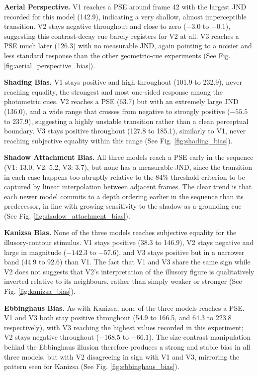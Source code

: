 \documentclass[10pt,twocolumn]{article}
\begin{document}
\textbf{Aerial Perspective.} V1 reaches a PSE around frame 42 with the largest JND
recorded for this model (142.9), indicating a very shallow, almost imperceptible
transition. V2 stays negative throughout and close to zero ($-3.0$ to $-0.1$), suggesting
this contrast-decay cue barely registers for V2 at all. V3 reaches a PSE much later
(126.3) with no measurable JND, again pointing to a noisier and less standard response
than the other geometric-cue experiments (See Fig. \ref{fig:aerial_perspective_bias}).

\textbf{Shading Bias.} V1 stays positive and high throughout (101.9 to 232.9), never
reaching equality, the strongest and most one-sided response among the photometric
cues. V2 reaches a PSE (63.7) but with an extremely large JND (136.0), and a wide range
that crosses from negative to strongly positive ($-55.5$ to $237.9$), suggesting a highly
unstable transition rather than a clean perceptual boundary. V3 stays positive throughout
(127.8 to 185.1), similarly to V1, never reaching subjective equality within this range (See Fig. \ref{fig:shading_bias}).

\textbf{Shadow Attachment Bias.} All three models reach a PSE early in the sequence (V1:
13.0, V2: 5.2, V3: 3.7), but none has a measurable JND, since the transition in each case
happens too abruptly relative to the 84\% threshold criterion to be captured by linear
interpolation between adjacent frames. The clear trend is that each newer model commits
to a depth ordering earlier in the sequence than its predecessor, in line with growing
sensitivity to the shadow as a grounding cue (See Fig. \ref{fig:shadow_attachment_bias}).

\textbf{Kanizsa Bias.} None of the three models reaches subjective equality for the
illusory-contour stimulus. V1 stays positive (38.3 to 146.9), V2 stays negative and large
in magnitude ($-142.3$ to $-57.6$), and V3 stays positive but in a narrower band (44.9
to 92.6) than V1. The fact that V1 and V3 share the same sign while V2 does not suggests
that V2's interpretation of the illusory figure is qualitatively inverted relative to its
neighbours, rather than simply weaker or stronger (See Fig. \ref{fig:kanizsa_bias}).

\textbf{Ebbinghaus Bias.} As with Kanizsa, none of the three models reaches a PSE. V1 and
V3 both stay positive throughout (54.9 to 166.5, and 64.3 to 223.8 respectively), with V3
reaching the highest values recorded in this experiment; V2 stays negative throughout
($-168.5$ to $-66.1$). The size-contrast manipulation behind the Ebbinghaus illusion
therefore produces a strong and stable bias in all three models, but with V2 disagreeing
in sign with V1 and V3, mirroring the pattern seen for Kanizsa (See Fig. \ref{fig:ebbinghaus_bias}).
\end{document}
